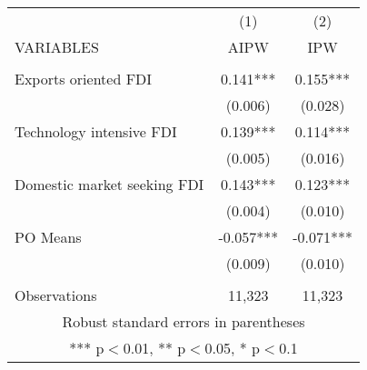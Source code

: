 \documentclass[]{article}
\begin{document}
\begin{tabular}{lcc} \hline
 & (1) & (2)  \\
VARIABLES & AIPW & IPW \\ \hline
 &    &  \\
Exports oriented FDI &  0.141*** &   0.155***  \\
 & (0.006) &   (0.028)   \\
Technology intensive FDI &0.139*** &   0.114***   \\
 & (0.005) &   (0.016)   \\
Domestic market seeking FDI  &0.143***   & 0.123*** \\
 & (0.004)   & (0.010)  \\
PO Means & -0.057*** &   -0.071***    \\
 &  (0.009) &   (0.010) \\
 &  &      \\
 Observations & 11,323  & 11,323  \\ \hline
\multicolumn{3}{c}{ Robust standard errors in parentheses} \\
\multicolumn{3}{c}{ *** p$<$0.01, ** p$<$0.05, * p$<$0.1} \\
\end{tabular}
\end{document}
